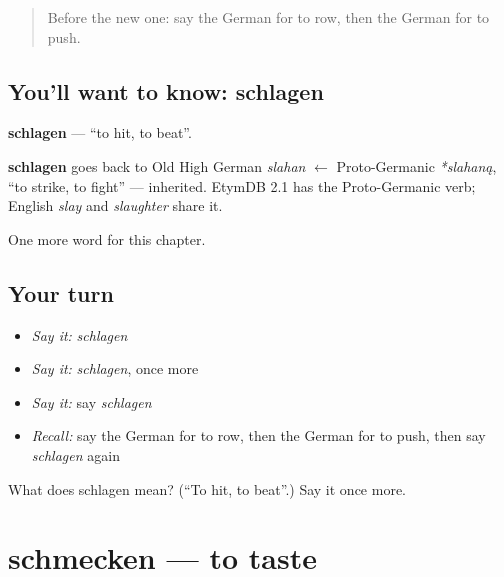 \label{lesson:GE-C185-schlagen}



\begin{quote}
Before the new one: say the German for to row, then the German for to push.
\end{quote}

\subsection*{You'll want to know: schlagen}
\textbf{schlagen} — \textquotedblleft{}to hit, to beat\textquotedblright{}.

\begin{cousinweb}
\textbf{schlagen} goes back to Old High German \emph{slahan} $\leftarrow$ Proto-Germanic \emph{*slahaną}, \textquotedblleft{}to strike, to fight\textquotedblright{} — inherited. EtymDB 2.1 has the Proto-Germanic verb; English \emph{slay} and \emph{slaughter} share it.
\end{cousinweb}

\begin{grammarlens}[title={What you've built}]
One more word for this chapter.
\end{grammarlens}

\subsection*{Your turn}
\begin{itemize}
\raggedright
  \item \emph{Say it:} \emph{schlagen}
  \item \emph{Say it:} \emph{schlagen}, once more
  \item \emph{Say it:} say \emph{schlagen}
  \item \emph{Recall:} say the German for to row, then the German for to push, then say \emph{schlagen} again
\end{itemize}

\begin{tcolorbox}[breakable,colback=teal!4,colframe=teal!35!black,title={Before you move on}]
What does schlagen mean? (\textquotedblleft{}To hit, to beat\textquotedblright{}.) Say it once more.
\end{tcolorbox}
\section[schmecken]{schmecken — to taste}

\label{lesson:GE-C185-schmecken}



